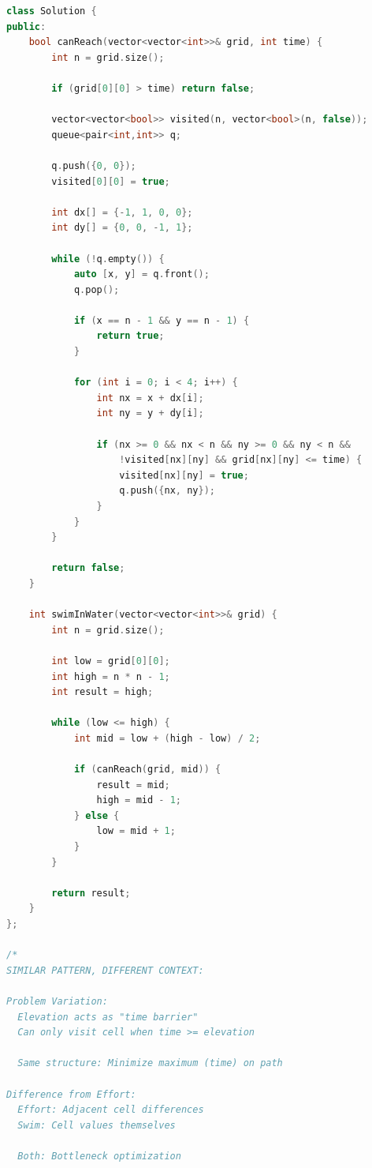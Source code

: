 \documentclass[11pt,a4paper,oneside]{book}
\begin{document}
\begin{lstlisting}[language=C++, caption=Complete Bottleneck Path Solutions - NEW PROBLEMS]
class Solution {
public:
    bool canReach(vector<vector<int>>& grid, int time) {
        int n = grid.size();
        
        if (grid[0][0] > time) return false;
        
        vector<vector<bool>> visited(n, vector<bool>(n, false));
        queue<pair<int,int>> q;
        
        q.push({0, 0});
        visited[0][0] = true;
        
        int dx[] = {-1, 1, 0, 0};
        int dy[] = {0, 0, -1, 1};
        
        while (!q.empty()) {
            auto [x, y] = q.front();
            q.pop();
            
            if (x == n - 1 && y == n - 1) {
                return true;
            }
            
            for (int i = 0; i < 4; i++) {
                int nx = x + dx[i];
                int ny = y + dy[i];
                
                if (nx >= 0 && nx < n && ny >= 0 && ny < n && 
                    !visited[nx][ny] && grid[nx][ny] <= time) {
                    visited[nx][ny] = true;
                    q.push({nx, ny});
                }
            }
        }
        
        return false;
    }
    
    int swimInWater(vector<vector<int>>& grid) {
        int n = grid.size();
        
        int low = grid[0][0];
        int high = n * n - 1;
        int result = high;
        
        while (low <= high) {
            int mid = low + (high - low) / 2;
            
            if (canReach(grid, mid)) {
                result = mid;
                high = mid - 1;
            } else {
                low = mid + 1;
            }
        }
        
        return result;
    }
};

/*
SIMILAR PATTERN, DIFFERENT CONTEXT:

Problem Variation:
  Elevation acts as "time barrier"
  Can only visit cell when time >= elevation
  
  Same structure: Minimize maximum (time) on path

Difference from Effort:
  Effort: Adjacent cell differences
  Swim: Cell values themselves
  
  Both: Bottleneck optimization


\end{lstlisting}
\end{document}
